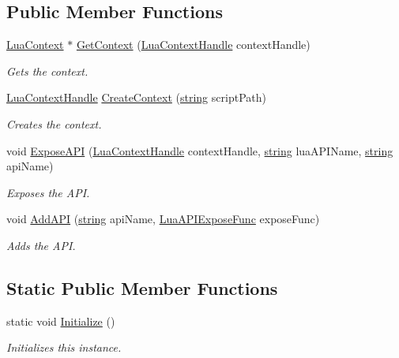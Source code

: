\subsection*{Public Member Functions}
\begin{DoxyCompactItemize}
\item 
\hyperlink{class_lua_context}{Lua\+Context} $\ast$ \hyperlink{class_lua_manager_a68592b46a59219d130cf4f637c977378}{Get\+Context} (\hyperlink{_lua_context_8h_a2ffcc2d3ed21165072a1d7b61259bf14}{Lua\+Context\+Handle} context\+Handle)
\begin{DoxyCompactList}\small\item\em Gets the context. \end{DoxyCompactList}\item 
\hyperlink{_lua_context_8h_a2ffcc2d3ed21165072a1d7b61259bf14}{Lua\+Context\+Handle} \hyperlink{class_lua_manager_a8b465c53f9998ea1d13f7b7242143395}{Create\+Context} (\hyperlink{_types_8h_ad453f9f71ce1f9153fb748d6bb25e454}{string} script\+Path)
\begin{DoxyCompactList}\small\item\em Creates the context. \end{DoxyCompactList}\item 
void \hyperlink{class_lua_manager_a09ec71f9d627e0d206686b3fbae4f4cc}{Expose\+A\+PI} (\hyperlink{_lua_context_8h_a2ffcc2d3ed21165072a1d7b61259bf14}{Lua\+Context\+Handle} context\+Handle, \hyperlink{_types_8h_ad453f9f71ce1f9153fb748d6bb25e454}{string} lua\+A\+P\+I\+Name, \hyperlink{_types_8h_ad453f9f71ce1f9153fb748d6bb25e454}{string} api\+Name)
\begin{DoxyCompactList}\small\item\em Exposes the A\+PI. \end{DoxyCompactList}\item 
void \hyperlink{class_lua_manager_ad780a43118af7d39f94bc001c7ae5b66}{Add\+A\+PI} (\hyperlink{_types_8h_ad453f9f71ce1f9153fb748d6bb25e454}{string} api\+Name, \hyperlink{_lua_a_p_i_8h_a696c6141f695520faf1eb927730bd123}{Lua\+A\+P\+I\+Expose\+Func} expose\+Func)
\begin{DoxyCompactList}\small\item\em Adds the A\+PI. \end{DoxyCompactList}\end{DoxyCompactItemize}
\subsection*{Static Public Member Functions}
\begin{DoxyCompactItemize}
\item 
static void \hyperlink{class_lua_manager_ac0bf2dac2f4de45307df2bbcc75e61f3}{Initialize} ()
\begin{DoxyCompactList}\small\item\em Initializes this instance. \end{DoxyCompactList}\end{DoxyCompactItemize}
